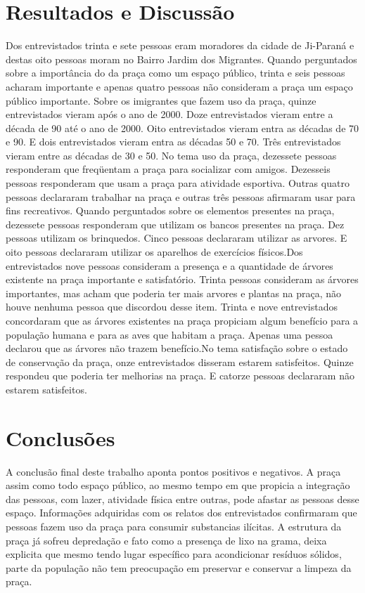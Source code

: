 \documentclass[article,12pt,onesidea,4paper,english,brazil]{abntex2}
\begin{document}
	
	\section*{Resultados e Discussão}
	
	Dos entrevistados trinta e sete pessoas eram moradores da cidade de Ji-Paraná e destas oito pessoas moram no Bairro Jardim dos Migrantes.
	Quando perguntados sobre a importância do da praça como um espaço público, trinta e seis pessoas acharam importante e apenas quatro pessoas não consideram a praça um espaço público importante.
	Sobre os imigrantes que fazem uso da praça, quinze entrevistados vieram após o ano de 2000. Doze entrevistados vieram entre a década de 90 até o ano de 2000. Oito entrevistados vieram entra as décadas de 70 e 90. E dois entrevistados vieram entra as décadas 50 e 70. Três entrevistados vieram entre as décadas de 30 e 50.
	No tema uso da praça, dezessete pessoas responderam que freqüentam a praça para socializar com amigos. Dezesseis pessoas responderam que usam a praça para atividade esportiva. Outras quatro pessoas declararam trabalhar na praça e outras três pessoas afirmaram usar para fins recreativos.
	Quando perguntados sobre os elementos presentes na praça, dezessete pessoas responderam que utilizam os bancos presentes na praça. Dez pessoas utilizam os brinquedos. Cinco pessoas declararam utilizar as arvores. E  oito pessoas declararam utilizar os aparelhos de exercícios físicos.Dos entrevistados nove pessoas consideram a presença e a quantidade de árvores existente na praça importante e satisfatório. Trinta pessoas consideram as árvores importantes, mas acham que poderia ter mais arvores e plantas na praça, não houve nenhuma pessoa que discordou desse item.
	Trinta e nove entrevistados concordaram que as árvores existentes na praça propiciam algum benefício para a população humana e para as aves que habitam a praça. Apenas uma pessoa declarou que as árvores não trazem benefício.No tema satisfação sobre o estado de conservação da praça, onze entrevistados disseram estarem satisfeitos. Quinze respondeu que poderia ter
	melhorias na praça. E catorze pessoas declararam não estarem satisfeitos.
	
	\section*{Conclusões}
	
	A conclusão final deste trabalho aponta pontos positivos e negativos. A praça assim como todo espaço público, ao mesmo tempo em que propicia a integração das pessoas, com lazer, atividade física entre outras, pode afastar as pessoas desse espaço. Informações adquiridas com os relatos dos entrevistados confirmaram que pessoas fazem uso da praça para consumir substancias ilícitas. A estrutura da praça já sofreu depredação e fato como a presença de lixo na grama, deixa explicita que mesmo tendo lugar específico para acondicionar resíduos sólidos, parte da população não tem preocupação em preservar e conservar a limpeza da praça.
	
\end{document}
